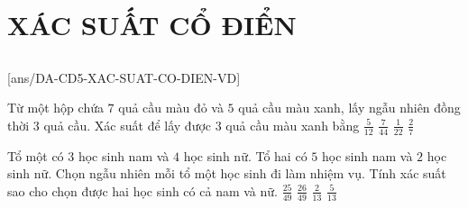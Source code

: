 \section{XÁC SUẤT CỔ ĐIỂN}
\subsection{\vdmh}
[ans/DA-CD5-XAC-SUAT-CO-DIEN-VD]
\begin{vd}%
    Từ một hộp chứa $7$ quả cầu màu đỏ và $5$ quả cầu màu xanh, lấy ngẫu nhiên đồng thời $3$ quả cầu. Xác suất để lấy được $3$ quả cầu màu xanh bằng
    \choice
    {$\frac{5}{12}$}
    {$\frac{7}{44}$}
    {\True $\frac{1}{22}$}
    {$\frac{2}{7}$}
\end{vd}
\begin{vd}%
    Tổ một có $3$ học sinh nam và $4$ học sinh nữ. Tổ hai có $5$ học sinh nam và $2$ học sinh nữ. Chọn ngẫu nhiên mỗi tổ một học sinh đi làm nhiệm vụ. Tính xác suất sao cho chọn được hai học sinh có cả nam và nữ.
    \choice
    {$\frac{25}{49}$}
    {\True $\frac{26}{49}$}
    {$\frac{2}{13}$}
    {$\frac{5}{13}$}
\end{vd}
